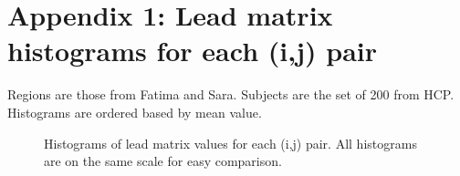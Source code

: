 \documentclass[11pt]{article}
\begin{document}
\section{Appendix 1: Lead matrix histograms for each (i,j) pair}
Regions are those from Fatima and Sara. Subjects are the set of 200 from HCP. Histograms are ordered based by mean value.
\label{app:slm_hist}
\begin{figure}[H]

\caption{Histograms of lead matrix values for each (i,j) pair. All histograms are on the same scale for easy comparison.}
\end{figure}
\end{document}
